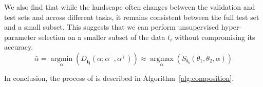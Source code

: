 

We also find that while the landscape often changes between the validation and test sets and across different tasks, it remains consistent between the full test set and a small subset. This suggests that we can perform unsupervised hyper-parameter selection on a smaller subset of the data $\bar{t_i}$ without compromising its accuracy.
\[
\bar{\alpha} = \operatorname*{argmin}_{\alpha}(D_{\mathbf{\bar{t_i}}}(\alpha; \alpha^-, \alpha^+)) \approx \operatorname*{argmax}_{\alpha}(S_{\mathbf{t_i}}(\theta_1, \theta_2, \alpha))
\]

In conclusion, the process of \ours is described in Algorithm~\ref{alg:composition}.








